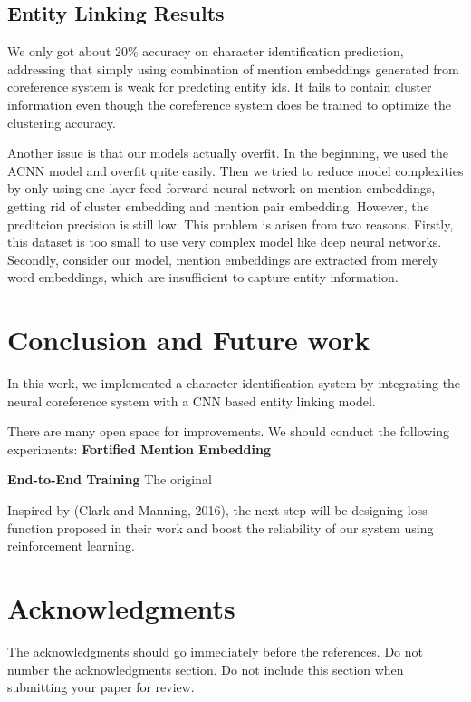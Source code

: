 \documentclass[11pt]{article}
\begin{document}
\subsection{Entity Linking Results}
We only got about 20\% accuracy on character identification prediction, addressing that simply using combination of mention embeddings generated from coreference system is weak for predcting entity ids. It fails to contain cluster information even though the coreference system does be trained to optimize the clustering accuracy. 

Another issue is that our models actually overfit. In the beginning, we used the ACNN model and overfit quite easily. Then we tried to reduce model complexities by only using one layer feed-forward neural network on mention embeddings, getting rid of cluster embedding and mention pair embedding. However, the preditcion precision is still low. This problem is arisen from two reasons. Firstly, this dataset is too small to use very complex model like deep neural networks. Secondly, consider our model, mention embeddings are extracted from merely word embeddings, which are insufficient to capture entity information.

\section{Conclusion and Future work}

In this work, we implemented a character identification system by integrating the neural coreference system with a CNN based entity linking model.  

There are many open space for improvements. We should conduct the following experiments:
{\bf Fortified Mention Embedding} 

{\bf End-to-End Training}
The original 


 Inspired by (Clark and Manning, 2016), the next step will be designing loss function proposed in their work and boost the reliability of our system using reinforcement learning.

\section*{Acknowledgments}

The acknowledgments should go immediately before the references.  Do
not number the acknowledgments section. Do not include this section
when submitting your paper for review.

%
%


\end{document}
